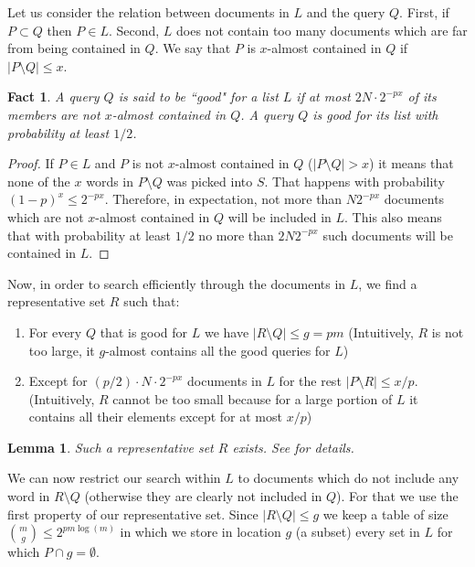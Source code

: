 \documentclass{article}
\newtheorem{fact}{Fact}[section]
\newtheorem{lemma}{Lemma}[section]
\begin{document}
Let us consider the relation between documents in $L$ and the query $Q$.
First, if $P\subset Q$ then $P \in L$.
Second, $L$ does not contain too many documents which are far from being contained in $Q$. 
We say that $P$ is $x$-almost contained in $Q$ if $|P \setminus Q| \le x$.
\begin{fact}
A query $Q$ is said to be ``good" for a list $L$ if at most $2N \cdot 2^{-px}$ of its members 
are not $x$-almost contained in $Q$. A query $Q$ is good for its list with probability at least $1/2$.
\end{fact}
\begin{proof}
If $P \in L$ and  $P$ is not $x$-almost contained in $Q$ ($|P \setminus Q| > x$) it means that 
none of the $x$ words in $P\setminus Q$ was picked into $S$. That happens with probability $(1-p)^{x} \le 2^{-px}$.
Therefore, in expectation, not more than $N2^{-px}$ documents which are not  $x$-almost contained in $Q$
will be included in $L$. This also means that with probability at least $1/2$ no more than $2N2^{-px}$ such 
documents will be contained in $L$.
\end{proof}

Now, in order to search efficiently through the documents in $L$, we find a representative set $R$ such that:
\begin{enumerate}
\item For every $Q$ that is good for $L$ we have $|R \setminus Q| \le g = pm$ (Intuitively, $R$ is not too large, it $g$-almost contains all the good queries for $L$) 
\item Except for $(p/2)\cdot N\cdot2^{-px}$ documents in $L$ for the rest $|P \setminus R| \le x/p$. (Intuitively, $R$ cannot be too small because for
a large portion of $L$ it contains all their elements except for at most $x/p$)
\end{enumerate}
\begin{lemma}
Such a representative set $R$ exists. See \cite{CIP02} for details.
\end{lemma}
We can now restrict our search within $L$ to documents which
do not include any word in $R \setminus Q$ (otherwise they are clearly not included in $Q$).
For that we use the first property of our representative set. Since  $|R \setminus Q| \le g$ we keep a table of
size ${m \choose g} \le 2^{pm\log(m)}$ in which we store in location $g$ (a subset) every set in $L$ for which $ P \cap g = \emptyset$.
\end{document}
